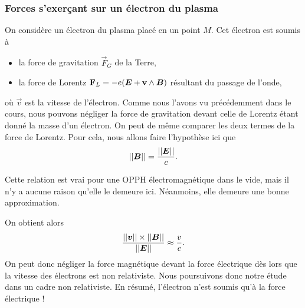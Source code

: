 \subsubsection{Forces s'exerçant sur un électron du plasma}
On considère un électron du plasma placé en un point $M$.
Cet électron est soumis à
\begin{itemize}
	\item la force de gravitation $\vec{F}_G$ de la Terre,
	\item la force de Lorentz $\vec{F}_L = -e(\vece + \vec{v} \wedge \vecb)$ 
	  résultant du passage de l'onde,
\end{itemize}
où $\vec{v}$ est la vitesse de l'électron. Comme nous l'avons vu précédemment
dans le cours, nous pouvons négliger la force de gravitation devant celle de Lorentz
étant donné la masse d'un électron. On peut de même comparer les deux
termes de la force de Lorentz. Pour cela, nous allons faire l'hypothèse ici que
\begin{equation*}
	||\vecb|| = \dfrac{||\vece||}{c}.
\end{equation*}

\begin{rema}
Cette relation est vrai pour une OPPH électromagnétique dans le vide, mais il n'y a
aucune raison qu'elle le demeure ici. Néanmoins, elle demeure une bonne approximation.
\end{rema}

On obtient alors 
\begin{equation*}
	\dfrac{||\vecv|| \times ||\vecb||}{||\vece||} \approx \dfrac{v}{c}.
\end{equation*}
On peut donc négliger la force magnétique devant la force électrique dès lors
que la vitesse des électrons est non relativiste. Nous poursuivons donc notre 
étude dans un cadre non relativiste. En résumé, l'électron n'est soumis qu'à la
force électrique !

